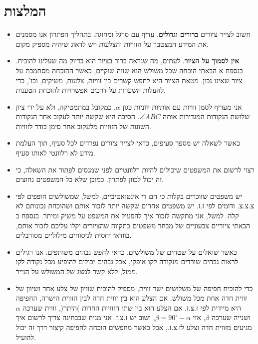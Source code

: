 \documentclass[12pt,a4paper]{article}
\begin{document}


\newpage

\section{המלצות}

\begin{itemize}
\item
חשוב לצייר ציורים 
\textbf{ברורים וגדולים},
עדיף עם סרגל ומחוגה. בתהליך הפתרון אנו מסמנים את המידע המצטבר על הזוויות והצלעות ויש לדאוג שיהיה מספיק מקום.

\item
\textbf{אין לסמוך על הציור}.
לעתים, מה שנראה ברור בציור הוא בדיוק מה שעלינו להוכיח. בנספח א הבאתי הוכחה שכל משולש הוא שווה שוקיים, כאשר ההוכחה מסתמכת על ציור שאינו נכון. מטאת הציור היא לחפש קשרים בין זוויות, צלעות, משיקים, וכו', כדי להעלות השערות על דרכים אפשרויות להוכחת הטענות.

\item
אני מעדיף לסמן זוויות עם אותיות יווניות כגון
$\alpha$,
כמקובל במתמטיקה, ולא על ידי ציון שלושת הנקודות המגדירות אותה
$\angle ABC$.
הסיבה היא שקשה יותר לעקוב אחר הנקודות השונות של הזוויות מלעקוב אחר סימן בודד לזוויות.

\item
כאשר לשאלה יש מספר סעיפים, כדאי לצייר ציורים נפרדים לכל סעיף, תוך העלמת מידע לא רלוונטי לאותו סעיף.

\item
רצוי לרשום את המשפטים שיכולים להיות רלוונטיים לפני שמנסים לפתור את השאלה, כי זה יכול לכוון לפתרון. כמובן שלא כל המשפטים נחוצים.

\item
יש משפטים שזוכרים בקלות כי הם די אינטואטיביים, למשל, שמשולשים חופפים לפי צ.צ.צ. ודומים לפי ז.ז. יש משפטים אחרים שקשה יותר לזכור אותם ושהוכחת נכונותם לא קלה. למשל, אני מתקשה לזכור איך להפעיל את המשפט על משיק ומיתר. בנספח ב הבאתי ציוריים צבעוניים של מבחר משפטים בתקווה שהציורים יקלו עליכם לזכור אותם, בוודאי יחסית לניסוחים מילוליים מסורבלים.

\item
כאשר שואלים על שטחים של משולשים, כדאי לחפש גבהים משותפים. אנו רגילים לראות גבהים שורדים מנקודה לקו אופקי, אבל גבהים יכולים להופיע מכל נקודה לקו ממול, ללא קשר למצג של המשולש על הנייר.

\item
כדי להוכיח חפיפה של משלושים ישר זווית, מספיק להוכיח שוויון של צלע אחד ושיוון של זווית חדה אחת מכל משולש. אם הצלע הוא בין זווית חדה לבין הזווית הישרה, החפיפה היא מיידית לפי ז.צ.ז. אם הצלע הוא בין שתי הזוויות החדות )היתר(, זווית שערכה 
$\alpha$
ושנייה שערכה
$\beta$,
אזי
$\beta=90^\circ-\alpha$,
ושוב יש ז.צ.ז. אני מניח שבבחינה צריך לרשום איך מגיעים מזווית חדה וצלע לז.צ.ז., אבל כאשר מחפשים הוכחה לחפיפה קיצור דרך זה יכול להועיל.

\end{itemize}
\end{document}
